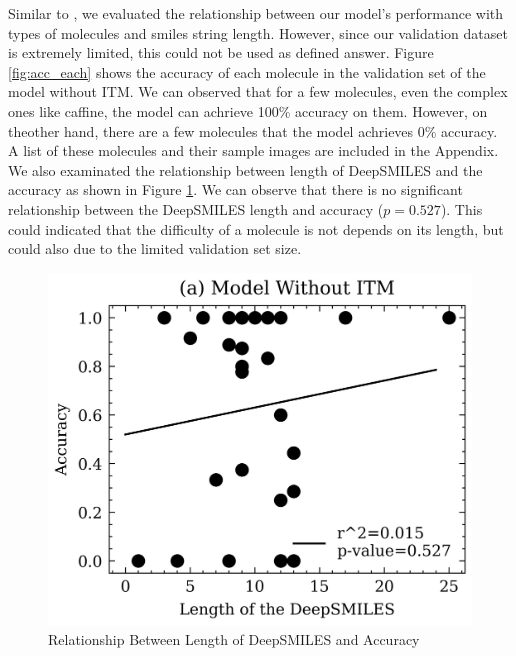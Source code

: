\documentclass[12pt]{article}
\begin{document}
Similar to \cite{swinocsr}, we evaluated the relationship between our model's performance with types of molecules and smiles string length. However, since our validation dataset is extremely limited, this could not be used as defined answer. Figure \ref{fig:acc_each} shows the accuracy of each molecule in the validation set of the model without ITM. We can observed that for a few molecules, even the complex ones like caffine, the model can achrieve 100\% accuracy on them. However, on theother hand, there are a few molecules that the model achrieves 0\% accuracy. A list of these molecules and their sample images are included in the Appendix. We also examinated the relationship between length of DeepSMILES and the accuracy as shown in Figure \ref{lenacc}. We can observe that there is no significant relationship between the DeepSMILES length and accuracy ($p=0.527$). This could indicated that the difficulty of a molecule is not depends on its length, but could also due to the limited validation set size.  

\begin{figure}
    \centering
    \includegraphics[width=0.5\linewidth]{lenacc.png}
    \caption{Relationship Between Length of DeepSMILES and Accuracy}
    \label{lenacc}
\end{figure}



\end{document}
